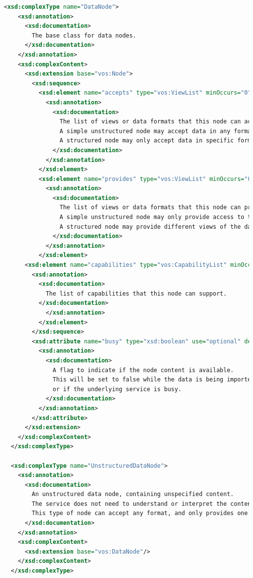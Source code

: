 \documentclass[11pt,a4paper]{ivoa}
\begin{document}
\begin{lstlisting}[language=xml, basicstyle=\scriptsize]
  <xsd:complexType name="DataNode">
    <xsd:annotation>
      <xsd:documentation>
        The base class for data nodes.
      </xsd:documentation>
    </xsd:annotation>
    <xsd:complexContent>
      <xsd:extension base="vos:Node">
        <xsd:sequence>
          <xsd:element name="accepts" type="vos:ViewList" minOccurs="0" maxOccurs="1">
            <xsd:annotation>
              <xsd:documentation>
                The list of views or data formats that this node can accept.
                A simple unstructured node may accept data in any format.
                A structured node may only accept data in specific formats. 
              </xsd:documentation>
            </xsd:annotation>
          </xsd:element>            
          <xsd:element name="provides" type="vos:ViewList" minOccurs="0" maxOccurs="1">
            <xsd:annotation>
              <xsd:documentation>
                The list of views or data formats that this node can provide.
                A simple unstructured node may only provide access to the data in the original format.
                A structured node may provide different views of the data generated by the service.
              </xsd:documentation>
            </xsd:annotation>
          </xsd:element>            
	  <xsd:element name="capabilities" type="vos:CapabilityList" minOccurs="0" maxOccurs="1">
	    <xsd:annotation>
	      <xsd:documentation>
	        The list of capabilities that this node can support. 
	      </xsd:documentation>
            </xsd:annotation>
          </xsd:element>
        </xsd:sequence>
        <xsd:attribute name="busy" type="xsd:boolean" use="optional" default="false">
          <xsd:annotation>
            <xsd:documentation>
              A flag to indicate if the node content is available.
              This will be set to false while the data is being imported,
              or if the underlying service is busy.
            </xsd:documentation>
          </xsd:annotation>
        </xsd:attribute>
      </xsd:extension>
    </xsd:complexContent>    
  </xsd:complexType>

  <xsd:complexType name="UnstructuredDataNode">
    <xsd:annotation>
      <xsd:documentation>
        An unstructured data node, containing unspecified content.
        The service does not need to understand or interpret the content.
        This type of node can accept any format, and only provides one view returning the original data.
      </xsd:documentation>
    </xsd:annotation>
    <xsd:complexContent>
      <xsd:extension base="vos:DataNode"/>
    </xsd:complexContent>    
  </xsd:complexType>


\end{lstlisting}
\end{document}
